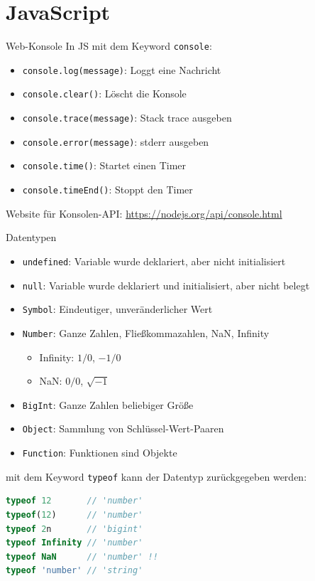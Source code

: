 

\section{JavaScript}
\begin{code}{Web-Konsole}
    In JS mit dem Keyword \texttt{console}:
    \begin{itemize}
        \item \texttt{console.log(message)}: Loggt eine Nachricht
        \item \texttt{console.clear()}: Löscht die Konsole
        \item \texttt{console.trace(message)}: Stack trace ausgeben
        \item \texttt{console.error(message)}: stderr ausgeben
        \item \texttt{console.time()}: Startet einen Timer
        \item \texttt{console.timeEnd()}: Stoppt den Timer
    \end{itemize}
    Website für Konsolen-API: \url{https://nodejs.org/api/console.html}
\end{code}

\begin{definition}{Datentypen}
    \begin{itemize}
        \item \texttt{undefined}: Variable wurde deklariert, aber nicht initialisiert
        \item \texttt{null}: Variable wurde deklariert und initialisiert, aber nicht belegt
        \item \texttt{Symbol}: Eindeutiger, unveränderlicher Wert
        \item \texttt{Number}: Ganze Zahlen, Fließkommazahlen, NaN, Infinity
        \begin{itemize}
            \item Infinity: $1/0$, $-1/0$
            \item NaN: $0/0$, $\sqrt{-1}$
        \end{itemize}
        \item \texttt{BigInt}: Ganze Zahlen beliebiger Größe
        \item \texttt{Object}: Sammlung von Schlüssel-Wert-Paaren
        \item \texttt{Function}: Funktionen sind Objekte
    \end{itemize}
\end{definition}

mit dem Keyword \texttt{typeof} kann der Datentyp zurückgegeben werden:
\begin{lstlisting}[language=JavaScript, style=base]
typeof 12       // 'number'
typeof(12)      // 'number'
typeof 2n       // 'bigint'
typeof Infinity // 'number'
typeof NaN      // 'number' !!
typeof 'number' // 'string'
\end{lstlisting}

